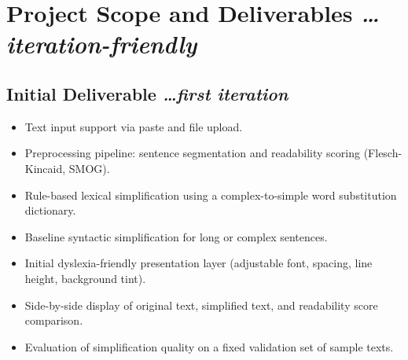 \documentclass[11pt,a4paper]{article}
\newcommand{\BvrHint}[1]{%
  {\normalfont\normalsize\itshape\hfill #1}}
\begin{document}
\section{Project Scope and Deliverables %
\BvrHint{\ldots iteration-friendly}}
\subsection{Initial Deliverable %
\BvrHint{\ldots first iteration}}
\begin{itemize}[leftmargin=0.7cm]
    \item Text input support via paste and file upload.
    
    \item Preprocessing pipeline: sentence segmentation and readability scoring (Flesch-Kincaid, SMOG).
    
    \item Rule-based lexical simplification using a complex-to-simple word substitution dictionary.
    
    \item Baseline syntactic simplification for long or complex sentences.
    
    \item Initial dyslexia-friendly presentation layer (adjustable font, spacing, line height, background tint).
    
    \item Side-by-side display of original text, simplified text, and readability score comparison.
    
    \item Evaluation of simplification quality on a fixed validation set of sample texts.
\end{itemize}
\end{document}
